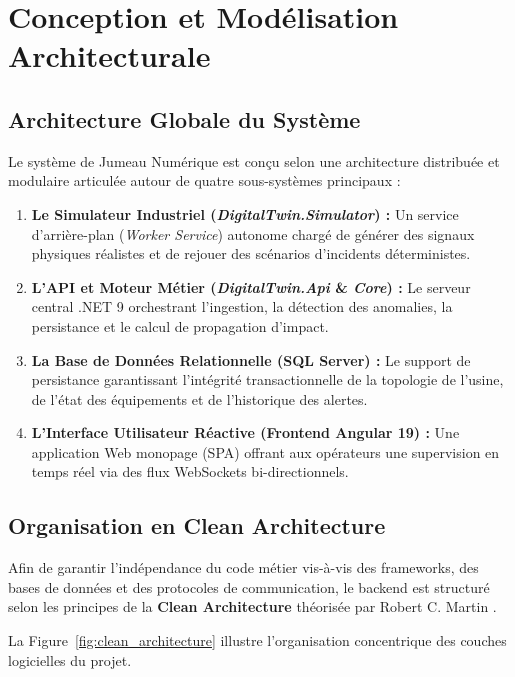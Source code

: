 ﻿\chapter{Conception et Modélisation Architecturale}

\section{Architecture Globale du Système}

Le système de Jumeau Numérique est conçu selon une architecture distribuée et modulaire articulée autour de quatre sous-systèmes principaux :

\begin{enumerate}
    \item \textbf{Le Simulateur Industriel (\textit{DigitalTwin.Simulator}) :} Un service d'arrière-plan (\textit{Worker Service}) autonome chargé de générer des signaux physiques réalistes et de rejouer des scénarios d'incidents déterministes.
    \item \textbf{L'API et Moteur Métier (\textit{DigitalTwin.Api} \& \textit{Core}) :} Le serveur central .NET 9 orchestrant l'ingestion, la détection des anomalies, la persistance et le calcul de propagation d'impact.
    \item \textbf{La Base de Données Relationnelle (SQL Server) :} Le support de persistance garantissant l'intégrité transactionnelle de la topologie de l'usine, de l'état des équipements et de l'historique des alertes.
    \item \textbf{L'Interface Utilisateur Réactive (Frontend Angular 19) :} Une application Web monopage (SPA) offrant aux opérateurs une supervision en temps réel via des flux WebSockets bi-directionnels.
\end{enumerate}

\section{Organisation en Clean Architecture}

Afin de garantir l'indépendance du code métier vis-à-vis des frameworks, des bases de données et des protocoles de communication, le backend est structuré selon les principes de la \textbf{Clean Architecture} théorisée par Robert C. Martin \cite{martin2017clean}.

La Figure~\ref{fig:clean_architecture} illustre l'organisation concentrique des couches logicielles du projet.


